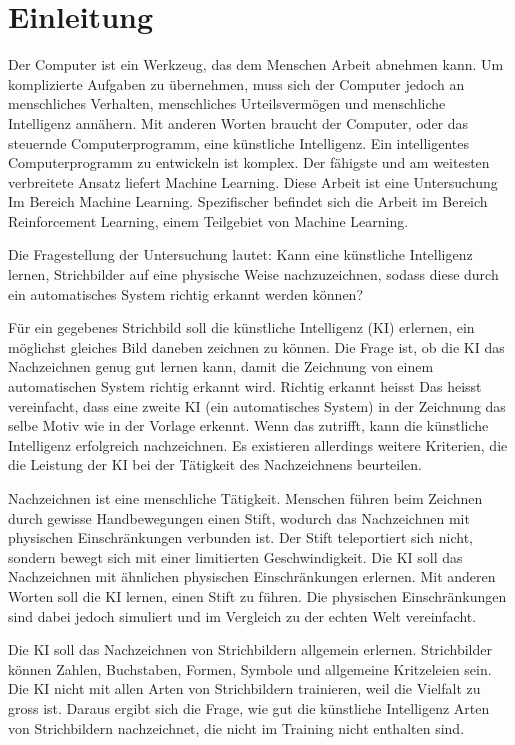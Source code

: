 \chapter{Einleitung}\label{chap:einleit}
Der Computer ist ein Werkzeug, das dem Menschen Arbeit abnehmen kann. Um
komplizierte Aufgaben zu übernehmen, muss sich der Computer jedoch an
menschliches Verhalten, menschliches Urteilsvermögen und menschliche Intelligenz
annähern. Mit anderen Worten braucht der Computer, oder das steuernde
Computerprogramm, eine künstliche Intelligenz. Ein intelligentes
Computerprogramm zu entwickeln ist komplex. Der fähigste und am weitesten
verbreitete Ansatz liefert Machine Learning. Diese Arbeit ist eine Untersuchung
Im Bereich Machine Learning. Spezifischer befindet sich die Arbeit im Bereich
Reinforcement Learning, einem Teilgebiet von Machine Learning.

Die Fragestellung der Untersuchung lautet: Kann eine künstliche Intelligenz
lernen, Strichbilder auf eine physische Weise nachzuzeichnen, sodass diese durch
ein automatisches System richtig erkannt werden können?

Für ein gegebenes Strichbild soll die künstliche Intelligenz (KI) erlernen, ein
möglichst gleiches Bild daneben zeichnen zu können. Die Frage ist, ob die KI das
Nachzeichnen genug gut lernen kann, damit die Zeichnung von einem automatischen
System richtig erkannt wird. Richtig erkannt heisst Das heisst vereinfacht,
dass eine zweite KI (ein automatisches System) in der Zeichnung das selbe Motiv wie in der Vorlage erkennt.
Wenn das zutrifft, kann die künstliche Intelligenz erfolgreich nachzeichnen. Es
existieren allerdings weitere Kriterien, die die Leistung der KI bei der
Tätigkeit des Nachzeichnens beurteilen.

Nachzeichnen ist eine menschliche Tätigkeit. Menschen führen beim Zeichnen durch
gewisse Handbewegungen einen Stift, wodurch das Nachzeichnen mit physischen
Einschränkungen verbunden ist. Der Stift teleportiert sich nicht, sondern bewegt
sich mit einer limitierten Geschwindigkeit. Die KI soll das Nachzeichnen mit
ähnlichen physischen Einschränkungen erlernen. Mit anderen Worten soll die KI
lernen, einen Stift zu führen. Die physischen Einschränkungen sind dabei jedoch
simuliert und im Vergleich zu der echten Welt vereinfacht. 

Die KI soll das Nachzeichnen von Strichbildern allgemein erlernen. Strichbilder
können Zahlen, Buchstaben, Formen, Symbole und allgemeine Kritzeleien sein. Die
KI nicht mit allen Arten von Strichbildern trainieren, weil die Vielfalt zu
gross ist. Daraus ergibt sich die Frage, wie gut die künstliche Intelligenz
Arten von Strichbildern nachzeichnet, die nicht im Training nicht enthalten sind.


